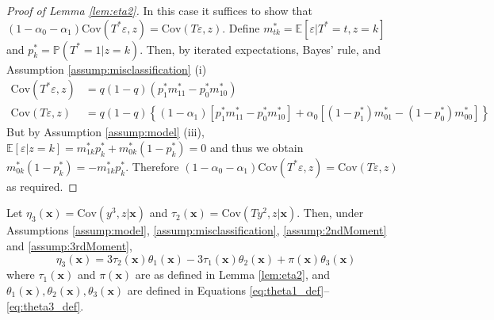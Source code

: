\documentclass[12pt]{article}
\begin{document}
\begin{proof}[Proof of Lemma \ref{lem:eta2}]
In this case it suffices to show that $(1 - \alpha_0 - \alpha_1) \mbox{Cov}(T^*\varepsilon,z) = \mbox{Cov}(T\varepsilon,z)$.
Define $m^*_{tk} = \mathbb{E}\left[ \varepsilon|T^*=t,z=k \right]$ and $p^*_k = \mathbb{P}(T^*=1|z=k)$.
Then, by iterated expectations, Bayes' rule, and Assumption \ref{assump:misclassification} (i)
\begin{align*}
  \mbox{Cov}(T^*\varepsilon,z) &=q(1 - q)\left(p_1^* m_{11}^*  - p_0^*m_{10}^* \right) \\
  \mbox{Cov}(T\varepsilon,z) &= q(1 - q)\left\{ (1 - \alpha_1)\left[ p_1^* m_{11}^* - p_0^* m_{10}^* \right] + \alpha_0\left[ (1 - p_1^*) m_{01}^* - (1 - p_0^*)m_{00}^* \right] \right\} 
\end{align*}
But by Assumption \ref{assump:model} (iii), $\mathbb{E}[\varepsilon|z=k] = m_{1k}^*p_{k}^* + m_{0k}^*(1 - p_k^*)=0$ and thus we obtain $m_{0k}^*(1 - p_k^*)= - m_{1k}^* p_k^*$.
Therefore  $(1 - \alpha_0 - \alpha_1) \mbox{Cov}(T^*\varepsilon,z) = \mbox{Cov}(T\varepsilon,z)$ as required.
\end{proof}
 


\begin{lem}
  Let $\eta_3(\mathbf{x}) = \mbox{Cov}(y^3,z|\mathbf{x})$ and $\tau_2(\mathbf{x}) = \mbox{Cov}(Ty^2,z|\mathbf{x})$.
  Then, under Assumptions \ref{assump:model}, \ref{assump:misclassification}, \ref{assump:2ndMoment} and \ref{assump:3rdMoment},
\[
  \eta_3(\mathbf{x}) =  3\tau_2(\mathbf{x}) \theta_1(\mathbf{x}) - 3\tau_1(\mathbf{x}) \theta_2(\mathbf{x}) + \pi(\mathbf{x})\theta_3(\mathbf{x})
\]
where $\tau_1(\mathbf{x})$ and $\pi(\mathbf{x})$ are as defined in Lemma \ref{lem:eta2}, and $\theta_1(\mathbf{x}), \theta_2(\mathbf{x}), \theta_3(\mathbf{x})$ are defined in Equations \ref{eq:theta1_def}--\ref{eq:theta3_def}.
  \label{lem:eta3}
\end{lem}
\end{document}
